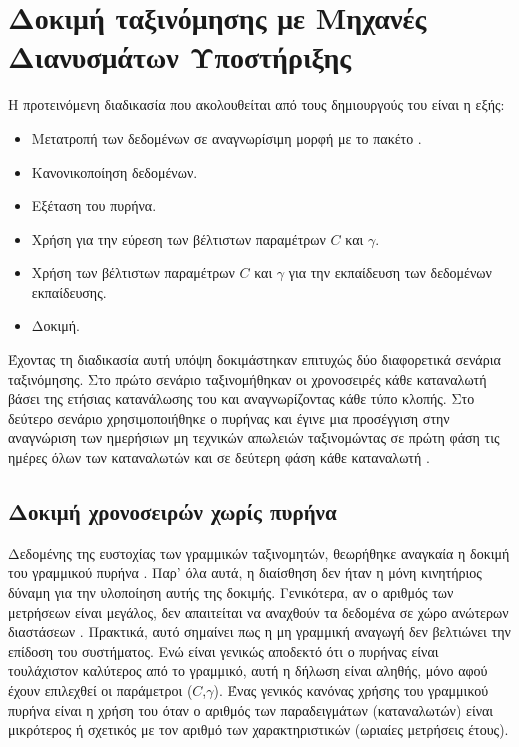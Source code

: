 \section{Δοκιμή ταξινόμησης με Μηχανές Διανυσμάτων Υποστήριξης}
Η προτεινόμενη διαδικασία που ακολουθείται από τους δημιουργούς του  είναι η εξής:
\begin{itemize}
\item Μετατροπή των δεδομένων σε αναγνωρίσιμη μορφή με το πακέτο .
\item Κανονικοποίηση δεδομένων.
\item Εξέταση του  πυρήνα.
\item Χρήση  για την εύρεση των βέλτιστων παραμέτρων $C$ και $\gamma$.
\item Χρήση των βέλτιστων παραμέτρων $C$ και $\gamma$ για την εκπαίδευση των δεδομένων εκπαίδευσης.
\item Δοκιμή.
\end{itemize}
Έχοντας τη διαδικασία αυτή υπόψη δοκιμάστηκαν επιτυχώς δύο διαφορετικά σενάρια ταξινόμησης. Στο πρώτο σενάριο ταξινομήθηκαν οι χρονοσειρές κάθε καταναλωτή βάσει της ετήσιας κατανάλωσης του και αναγνωρίζοντας κάθε τύπο κλοπής. Στο δεύτερο σενάριο χρησιμοποιήθηκε ο πυρήνας  και έγινε μια προσέγγιση στην αναγνώριση των ημερήσιων μη τεχνικών απωλειών ταξινομώντας σε πρώτη φάση τις ημέρες όλων των καταναλωτών και σε δεύτερη φάση κάθε καταναλωτή \cite{libsvmguide}.
\subsection{Δοκιμή χρονοσειρών χωρίς πυρήνα}
Δεδομένης της ευστοχίας των γραμμικών ταξινομητών, θεωρήθηκε αναγκαία η δοκιμή του γραμμικού πυρήνα . Παρ' όλα αυτά, η διαίσθηση δεν ήταν η μόνη κινητήριος δύναμη για την υλοποίηση αυτής της δοκιμής. Γενικότερα, αν ο αριθμός των μετρήσεων είναι μεγάλος, δεν απαιτείται να αναχθούν τα δεδομένα σε χώρο ανώτερων διαστάσεων \cite{libsvmguide}. Πρακτικά, αυτό σημαίνει πως η μη γραμμική αναγωγή δεν βελτιώνει την επίδοση του συστήματος. Ενώ είναι γενικώς αποδεκτό ότι ο πυρήνας  είναι τουλάχιστον καλύτερος από το γραμμικό, αυτή η δήλωση είναι αληθής, μόνο αφού έχουν επιλεχθεί οι παράμετροι ($C$,$\gamma$). Ένας γενικός κανόνας χρήσης του γραμμικού πυρήνα είναι η χρήση του όταν ο αριθμός των παραδειγμάτων (καταναλωτών) είναι μικρότερος ή σχετικός με τον αριθμό των χαρακτηριστικών (ωριαίες μετρήσεις έτους).
